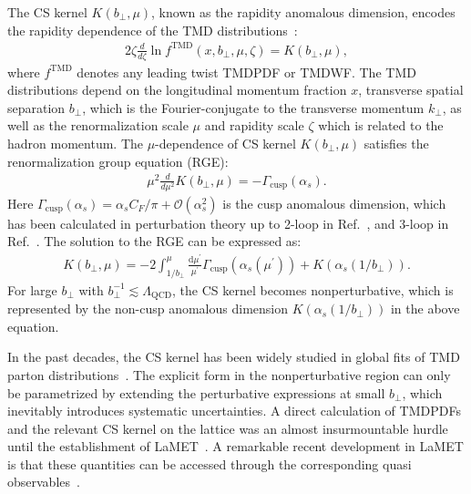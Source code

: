 \documentclass[prd,aps,twocolumn,preprintnumbers, showpacs, nofootinbib,superscriptaddress,notitlepage]{revtex4-1}
\begin{document}
The CS kernel $K\left(b_{\perp}, \mu\right)$, known as the rapidity anomalous dimension, encodes the rapidity dependence  of the TMD distributions~\cite{Collins:1981va,Collins:1981uk}:
\begin{align}
	2 \zeta \frac{d}{d \zeta} \ln f^{\mathrm{TMD}}\left(x, b_{\perp}, \mu, \zeta\right)=K\left(b_{\perp}, \mu\right), \label{eq:TMDsrapidityevolution}
\end{align}
where $f^{\mathrm{TMD}}$ denotes any leading twist TMDPDF or TMDWF. The TMD distributions depend on the longitudinal momentum fraction $x$, transverse spatial separation $b_{\perp}$, which is the Fourier-conjugate to the transverse momentum $k_{\perp}$, as well as the renormalization scale $\mu$ and rapidity scale $\zeta$ {which is related to the hadron momentum}. The $\mu$-dependence of CS kernel $K\left(b_{\perp}, \mu\right)$ satisfies the   renormalization group equation (RGE):
\begin{align}
	\mu^{2} \frac{d}{d \mu^{2}} K\left(b_{\perp}, \mu\right)=-\Gamma_{\text {cusp}}\left(\alpha_{s}\right).  \label{eq:cuspanomalousdimension}
\end{align}
Here $\Gamma_{\text {cusp}}\left(\alpha_{s}\right)=\alpha_sC_F/\pi+\mathcal{O}(\alpha_s^2)$ is the cusp anomalous dimension, which has been calculated  in  perturbation theory  up to 2-loop in Ref.~\cite{Li:2016ctv}, and 3-loop in Ref.~\cite{Moch:2017uml}. The solution to  the RGE  can be expressed as: 
\begin{align}
	K\left(b_{\perp}, \mu\right)=-2 \int_{1 / b_{\perp}}^{\mu} \frac{\mathrm{d} \mu^{\prime}}{\mu^{\prime}} \Gamma_{\text {cusp}}\left(\alpha_{s}\left(\mu^{\prime}\right)\right)+K\left(\alpha_{s}\left(1 / b_{\perp}\right)\right). 
	\label{eq:nonper-per-CS-kernel}
\end{align} 
For large $b_{\perp}$ with $b_{\perp}^{-1}\lesssim\Lambda_{\mathrm{QCD}}$, the CS kernel becomes nonperturbative, which is  represented by the non-cusp anomalous dimension $K\left(\alpha_{s}\left(1/b_{\perp}\right)\right)$ in the above equation. 

In the past decades, the CS kernel has  been widely studied in global fits of  TMD parton distributions~\cite{Landry:1999an,Landry:2002ix,DAlesio:2014mrz,Sun:2014dqm,Konychev:2005iy,Bacchetta:2017gcc,Scimemi:2017etj,Scimemi:2019cmh,Bacchetta:2019sam}. The explicit form in the nonperturbative region can only be parametrized by extending the perturbative expressions at  small $b_{\perp}$, which inevitably introduces systematic uncertainties. A direct calculation of TMDPDFs and the relevant CS kernel 
on the lattice was an almost insurmountable hurdle until the establishment  of LaMET~\cite{Ji:2013dva,Ji:2014gla}.  A remarkable recent development in LaMET is that  these quantities  can  be accessed through the corresponding quasi observables~\cite{Ebert:2019okf,Ji:2019sxk,Ji:2019ewn,Ji:2021znw}.
\end{document}
